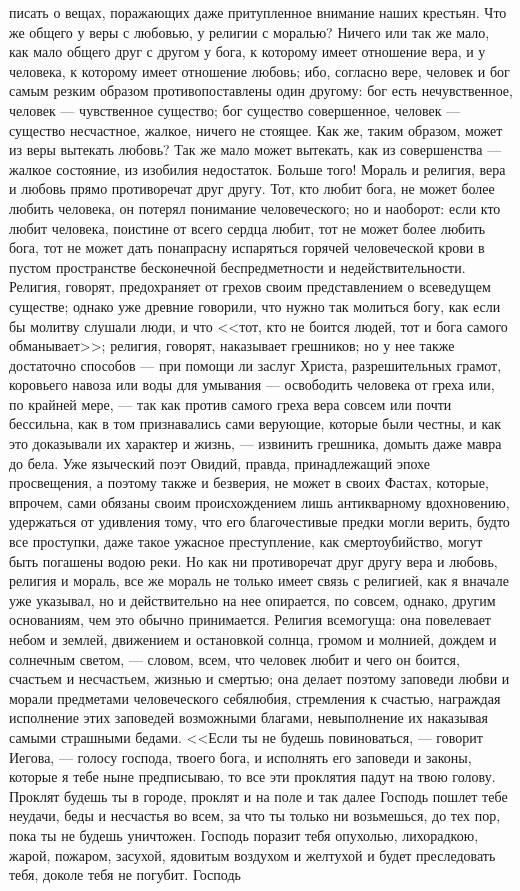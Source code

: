 \documentclass[12pt]{article}
\begin{document}
писать о вещах, поражающих даже притупленное внимание наших крестьян. Что же общего у веры с любовью, у религии с моралью? Ничего или так же мало, как мало общего друг с другом у бога, к которому имеет отношение вера, и у человека, к которому имеет отношение любовь; ибо, согласно вере, человек и бог самым резким образом противопоставлены один другому: бог есть нечувственное, человек --- чувственное существо; бог существо совершенное, человек --- существо несчастное, жалкое, ничего не стоящее. Как же, таким образом, может из веры вытекать любовь? Так же мало может вытекать, как из совершенства --- жалкое состояние, из изобилия недостаток. Больше того! Мораль и религия, вера и любовь прямо противоречат друг другу. Тот, кто любит бога, не может более любить человека, он потерял понимание человеческого; но и наоборот: если кто любит человека, поистине от всего сердца любит, тот не может более любить бога, тот не может дать понапрасну испаряться горячей человеческой крови в пустом пространстве бесконечной беспредметности и недействительности. Религия, говорят, предохраняет от грехов своим представлением о всеведущем существе; однако уже древние говорили, что нужно так молиться богу, как если бы молитву слушали люди, и что <<тот, кто не боится людей, тот и бога самого обманывает>>; религия, говорят, наказывает грешников; но у нее также достаточно способов --- при помощи ли заслуг Христа, разрешительных грамот, коровьего навоза или воды для умывания --- освободить человека от греха или, по крайней мере, --- так как против самого греха вера совсем или почти бессильна, как в том признавались сами верующие, которые были честны, и как это доказывали их характер и жизнь, --- извинить грешника, домыть даже мавра до бела. Уже языческий поэт Овидий, правда, принадлежащий эпохе просвещения, а поэтому также и безверия, не может в своих Фастах, которые, впрочем, сами обязаны своим происхождением лишь антикварному вдохновению, удержаться от удивления тому, что его благочестивые предки могли верить, будто все проступки, даже такое ужасное преступление, как смертоубийство, могут быть погашены водою реки. Но как ни противоречат друг другу вера и любовь, религия и мораль, все же мораль не только имеет связь с религией, как я вначале уже указывал, но и действительно на нее опирается, по совсем, однако, другим основаниям, чем это обычно принимается. Религия всемогуща: она повелевает небом и землей, движением и остановкой солнца, громом и молнией, дождем и солнечным светом, --- словом, всем, что человек любит и чего он боится, счастьем и несчастьем, жизнью и смертью; она делает поэтому заповеди любви и морали предметами человеческого себялюбия, стремления к счастью, награждая исполнение этих заповедей возможными благами, невыполнение их наказывая самыми страшными бедами. <<Если ты не будешь повиноваться, --- говорит Иегова, --- голосу господа, твоего бога, и исполнять его заповеди и законы, которые я тебе ныне предписываю, то все эти проклятия падут на твою голову. Проклят будешь ты в городе, проклят и на поле и так далее Господь пошлет тебе неудачи, беды и несчастья во всем, за что ты только ни возьмешься, до тех пор, пока ты не будешь уничтожен. Господь поразит тебя опухолью, лихорадкою, жарой, пожаром, засухой, ядовитым воздухом и желтухой и будет преследовать тебя, доколе тебя не погубит. Господь 
\end{document}
